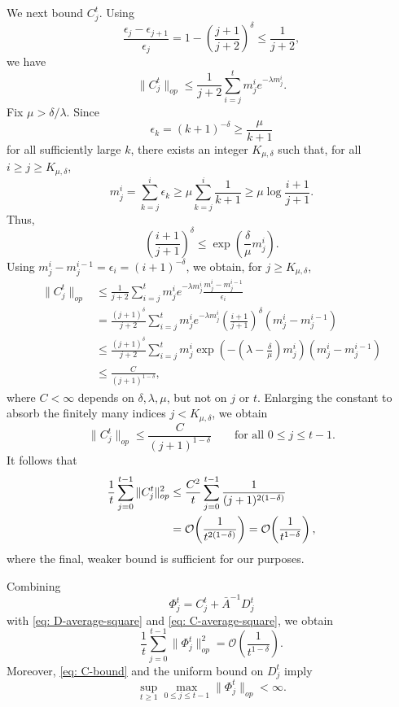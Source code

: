 \documentclass[11pt]{article}
\begin{document}
We next bound $C_j^t$. Using
\[
\frac{\epsilon_j-\epsilon_{j+1}}{\epsilon_j}
=
1-\left(\frac{j+1}{j+2}\right)^\delta
\leq
\frac{1}{j+2},
\]
we have
\[
\|C_j^t\|_{op}
\leq
\frac{1}{j+2}\sum_{i=j}^t m_j^i e^{-\lambda m_j^i}.
\]
Fix $\mu>\delta/\lambda$. Since
\[
\epsilon_k=(k+1)^{-\delta}\geq \frac{\mu}{k+1}
\]
for all sufficiently large $k$, there exists an integer
$K_{\mu,\delta}$ such that, for all $i\geq j\geq K_{\mu,\delta}$,
\[
m_j^i
=
\sum_{k=j}^i \epsilon_k
\geq
\mu\sum_{k=j}^i \frac1{k+1}
\geq
\mu\log\frac{i+1}{j+1}.
\]
Thus,
\[
\left(\frac{i+1}{j+1}\right)^\delta
\leq
\exp\!\left(\frac{\delta}{\mu}m_j^i\right).
\]
Using $m_j^i-m_j^{i-1}=\epsilon_i=(i+1)^{-\delta}$, we obtain, for
$j\geq K_{\mu,\delta}$,
\begin{align*}
\|C_j^t\|_{op}
&\leq
\frac{1}{j+2}
\sum_{i=j}^t
m_j^i e^{-\lambda m_j^i}
\frac{m_j^i-m_j^{i-1}}{\epsilon_i}\\
&=
\frac{ (j+1)^\delta}{j+2}
\sum_{i=j}^t
m_j^i e^{-\lambda m_j^i}
\left(\frac{i+1}{j+1}\right)^\delta
(m_j^i-m_j^{i-1})\\
&\leq
\frac{ (j+1)^\delta}{j+2}
\sum_{i=j}^t
m_j^i
\exp\!\left(-\left(\lambda-\frac{\delta}{\mu}\right)m_j^i\right)
(m_j^i-m_j^{i-1})\\
&\leq
\frac{C}{(j+1)^{1-\delta}},
\end{align*}
where $C<\infty$ depends on $\delta,\lambda,\mu$, but not on $j$ or
$t$. Enlarging the constant to absorb the finitely many indices
$j<K_{\mu,\delta}$, we obtain
\begin{equation}\label{eq: C-bound}
\|C_j^t\|_{op}
\leq
\frac{C}{(j+1)^{1-\delta}}
\qquad
\text{for all }0\leq j\leq t-1.
\end{equation}
It follows that
\begin{align}
\frac1t\sum_{j=0}^{t-1}\|C_j^t\|_{op}^2
&\leq
\frac{C^2}{t}\sum_{j=0}^{t-1}\frac1{(j+1)^{2(1-\delta)}}\notag\\
&=
\mathcal O\!\left(\frac1{t^{2(1-\delta)}}\right)
=
\mathcal O\!\left(\frac1{t^{1-\delta}}\right),
\label{eq: C-average-square}
\end{align}
where the final, weaker bound is sufficient for our purposes.

Combining
\[
\Phi_j^t=C_j^t+\bar A^{-1}D_j^t
\]
with \eqref{eq: D-average-square} and \eqref{eq: C-average-square}, we
obtain
\begin{equation}\label{eq: Phi-average-square}
\frac1t\sum_{j=0}^{t-1}\|\Phi_j^t\|_{op}^2
=
\mathcal O\!\left(\frac1{t^{1-\delta}}\right).
\end{equation}
Moreover, \eqref{eq: C-bound} and the uniform bound on $D_j^t$ imply
\begin{equation}\label{eq: Phi-uniform}
    \sup_{t\geq1}\max_{0\leq j\leq t-1}\|\Phi_j^t\|_{op}<\infty.
\end{equation}
\end{document}
